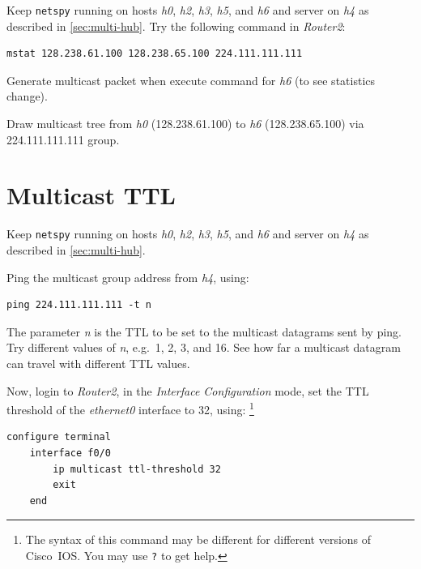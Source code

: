 \documentclass{../UTNetLab}
\begin{document}
Keep \lstinline{netspy} running on hosts \textit{h0}, \textit{h2}, \textit{h3}, \textit{h5}, and \textit{h6} and server on \textit{h4} as described in \autoref{sec:multi-hub}.
Try the following command in \textit{Router2}:

\begin{lstlisting}[language={cisco}]
mstat 128.238.61.100 128.238.65.100 224.111.111.111
    \end{lstlisting}

Generate multicast packet when execute command for \textit{h6} (to see statistics change).

\begin{report}
    \item Draw multicast tree from \textit{h0} (128.238.61.100) to \textit{h6} (128.238.65.100) via 224.111.111.111 group.
\end{report}

\section{Multicast TTL}
Keep \lstinline{netspy} running on hosts \textit{h0}, \textit{h2}, \textit{h3}, \textit{h5}, and \textit{h6} and server on \textit{h4} as described in \autoref{sec:multi-hub}.

Ping the multicast group address from \textit{h4}, using:

\begin{lstlisting}[emph={n}]
ping 224.111.111.111 -t n
    \end{lstlisting}

The parameter \textit{n} is the TTL to be set to the multicast datagrams sent by ping.
Try different values of \textit{n}, e.g.\ 1, 2, 3, and 16.
See how far a multicast datagram can travel with different TTL values.

Now, login to \textit{Router2}, in the \textit{Interface Configuration} mode, set the TTL threshold of the \textit{ethernet0} interface to 32, using:
\footnote{The syntax of this command may be different for different versions of Cisco~IOS.
    You may use \lstinline[language={cisco}]{?} to get help.}

\begin{lstlisting}[language={cisco}]    
configure terminal
    interface f0/0
        ip multicast ttl-threshold 32
        exit
    end
    \end{lstlisting}
\end{document}
